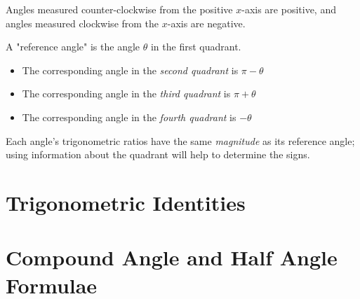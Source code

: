 \documentclass[11pt]{article}
\begin{document}
\noindent Angles measured counter-clockwise from the positive $x$-axis are positive, and angles measured clockwise from the $x$-axis are negative.

\noindent A "reference angle" is the angle $\theta$ in the first quadrant.
\begin{itemize}
  \item The corresponding angle in the \textit{second quadrant} is $\pi - \theta$
  \item The corresponding angle in the \textit{third quadrant} is $\pi + \theta$
  \item The corresponding angle in the \textit{fourth quadrant} is $- \theta$
\end{itemize}
Each angle's trigonometric ratios have the same \textit{magnitude} as its reference angle; using information about the quadrant will help to determine the signs.

\pagebreak

\section{Trigonometric Identities}
\section{Compound Angle and Half Angle Formulae}
\end{document}
